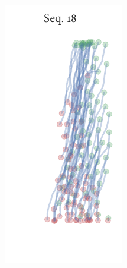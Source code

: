 \begin{figure}[h]
\begin{subfigure}[t]{0.5\textwidth}
	\end{subfigure}%
	\begin{subfigure}[t]{0.5\textwidth}
		\centering
		\includegraphics{streamline_sequence18.pdf}
	\end{subfigure}
\end{figure}

